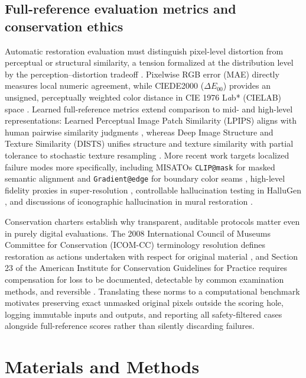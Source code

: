 \documentclass[fleqn,12pt,lineno]{wlpeerj}
\begin{document}
\subsection{Full-reference evaluation metrics and conservation ethics}\label{full-reference-evaluation-metrics-and-conservation-ethics}

Automatic restoration evaluation must distinguish pixel-level distortion from perceptual or structural similarity, a tension formalized at the distribution level by the perception--distortion tradeoff \citep{blau2018}. Pixelwise RGB error (MAE) directly measures local numeric agreement, while CIEDE2000 (\texttt{\ensuremath{\Delta E_{00}}}) provides an unsigned, perceptually weighted color distance in CIE 1976 L\emph{a}b* (CIELAB) space \citep{luo2001ciede2000, sharma2005ciede2000}. Learned full-reference metrics extend comparison to mid- and high-level representations: Learned Perceptual Image Patch Similarity (LPIPS) aligns with human pairwise similarity judgments \citep{zhang2018lpips}, whereas Deep Image Structure and Texture Similarity (DISTS) unifies structure and texture similarity with partial tolerance to stochastic texture resampling \citep{ding2020dists}. More recent work targets localized failure modes more specifically, including MISATO\textquotesingle s \texttt{CLIP@mask} for masked semantic alignment and \texttt{Gradient@edge} for boundary color seams \citep{wang2025misato}, high-level fidelity proxies in super-resolution \citep{rocafort2025}, controllable hallucination testing in HalluGen \citep{kim2026hallugen}, and discussions of iconographic hallucination in mural restoration \citep{ren2026mapgr}.

Conservation charters establish why transparent, auditable protocols matter even in purely digital evaluations. The 2008 International Council of Museums Committee for Conservation (ICOM-CC) terminology resolution defines restoration as actions undertaken with respect for original material \citep{icomcc2008}, and Section 23 of the American Institute for Conservation Guidelines for Practice requires compensation for loss to be documented, detectable by common examination methods, and reversible \citep{aic1994}. Translating these norms to a computational benchmark motivates preserving exact unmasked original pixels outside the scoring hole, logging immutable inputs and outputs, and reporting all safety-filtered cases alongside full-reference scores rather than silently discarding failures.

\section{Materials and Methods}\label{materials-and-methods}
\end{document}
